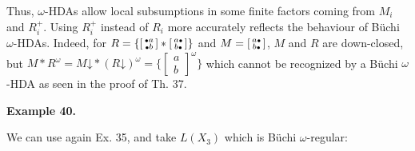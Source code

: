 Thus, $\omega$-HDAs allow local subsumptions in some finite factors coming from $M_{i}$ and $R_{i}^{+}$. Using $R_{i}^{+}$ instead of $R_{i}$ more accurately reflects the behaviour of Büchi $\omega$-HDAs. Indeed, for $R={\{\left[\begin{smallmatrix}\vbox{\hbox{\tiny$\bullet$}}a\\
\vbox{\hbox{\tiny$\bullet$}}b\end{smallmatrix}\right]*\left[\begin{smallmatrix}a\vbox{\hbox{\tiny$\bullet$}}\\
b\vbox{\hbox{\tiny$\bullet$}}\end{smallmatrix}\right]\}}$ and $M=\left[\begin{smallmatrix}a\vbox{\hbox{\tiny$\bullet$}}\\
b\vbox{\hbox{\tiny$\bullet$}}\end{smallmatrix}\right]$, $M$ and $R$ are down-closed, but $M*R^{\omega}=M\mathord{\downarrow}*(R\mathord{\downarrow})^{\omega}={\{\left[\begin{smallmatrix}a\\
b\end{smallmatrix}\right]^{\omega}\}}$ which cannot be recognized by a Büchi $\omega$-HDA as seen in the proof of Th. 37.\par
 
 
 
\par\medskip\noindent\textbf{Example 40.}\par
 
 
We can use again Ex. 35, and take $L(X_{3})$ which is Büchi $\omega$-regular:\par
 
